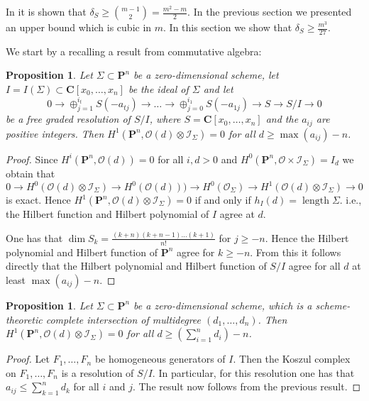 \documentclass{amsart}
\newcommand{\Ps}{\mathbf{P}}
\newcommand{\C}{\mathbf{C}}
\newcommand{\cO}{\mathcal{O}}
\newcommand{\cI}{\mathcal{I}}
\newtheorem{proposition}[lemma]{Proposition}
\theoremstyle{definition}
\theoremstyle{remark}
\DeclareMathOperator{\length}{length}
\begin{document}
In \cite{CiGa26} it is shown that $\delta_S\geq \binom{m-1}{2}=\frac{m^2-m}{2}$. In the previous section we presented an upper bound which is cubic in $m$. 
In this section we show that  $\delta_S\geq \frac{m^3}{27}$.

We start by a recalling a result from commutative algebra:

\begin{proposition} Let $\Sigma\subset \Ps^n$ be a zero-dimensional scheme, let $I=I(\Sigma)\subset \C[x_0,\dots,x_n]$ be the ideal of $\Sigma$ and let 
\[ 0 \to \oplus_{j=1}^{i_t} S(-a_{tj}) \to \dots \to \oplus_{j=0}^{i_1}S(-a_{1j}) \to S \to S/I \to 0\]
be a free graded resolution of $S/I$, where $S=\C[x_0,\dots, x_n]$ and the $a_{ij}$ are positive integers.
Then $H^1(\Ps^n,\cO(d)\otimes \cI_{\Sigma})=0$ for all $d\geq \max(a_{ij})-n$.
\end{proposition}

\begin{proof} Since $H^i(\Ps^n,\cO(d))=0$ for all $i,d>0$ and $H^0(\Ps^n,\cO\times \cI_{\Sigma})=I_d$ we obtain that
\[ 0 \to H^0(\cO(d)\otimes \cI_{\Sigma}) \to H^0(\cO(d))) \to H^0(\cO_{\Sigma}) \to H^1(\cO(d)\otimes \cI_{\Sigma}) \to 0 \] is exact.  
Hence  $H^1(\Ps^n,\cO(d)\otimes \cI_{\Sigma})=0$ if and only if $h_I(d)=\length \Sigma$. i.e., the Hilbert function and Hilbert polynomial of $I$ agree at $d$.

One has that $\dim S_k=\frac{(k+n)(k+n-1)\dots (k+1)}{n!}$ for $j\geq -n$. Hence the Hilbert polynomial and Hilbert function of $\Ps^n$ agree for $k\geq -n$. From this it follows directly that the Hilbert polynomial and Hilbert function of $S/I$ agree for all $d$ at least $\max(a_{ij})-n$.
\end{proof}

\begin{proposition}\label{prpHilbBound} Let $\Sigma\subset \Ps^n$ be a zero-dimensional scheme, which is a scheme-theoretic complete  intersection of multidegree $(d_1,\dots,d_n)$. 
Then $H^1(\Ps^n,\cO(d)\otimes \cI_{\Sigma})=0$ for all $d\geq (\sum_{i=1}^n d_i)-n$.
\end{proposition}
\begin{proof}
Let $F_1,\dots,F_n$ be  homogeneous generators of $I$. Then the Koszul complex on $F_1,\dots,F_n$ is a resolution of $S/I$. In particular, for this resolution one has that $a_{ij}\leq \sum_{k=1}^n d_k$ for all $i$ and $j$. The result now follows from the previous result.
\end{proof}
\end{document}
